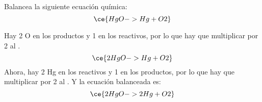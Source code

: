 Balancea la siguiente ecuación química:
\[\ce{HgO -> Hg + O2}\]
\begin{solutionbox}{4.2cm}
    Hay 2 O en los productos y 1 en los reactivos, por lo que hay que multiplicar por 2 al .
    \[ \ce{2HgO -> Hg + O2}\]
    Ahora, hay 2 Hg en los reactivos y 1 en los productos, por lo que hay que multiplicar por 2 al . Y la ecuación balanceada es:
    \[ \ce{2HgO -> 2Hg + O2}\]
\end{solutionbox}